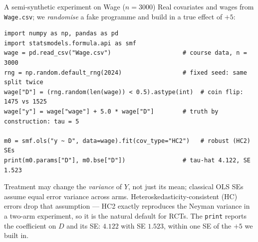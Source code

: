 \documentclass[aspectratio=169,11pt]{beamer}
\begin{document}
\begin{frame}[fragile]{A semi-synthetic experiment on Wage ($n=3000$)}
  \footnotesize
  Real covariates and wages from \texttt{Wage.csv}; we \emph{randomise} a fake programme
  and build in a true effect of $+5$:
  \begin{lstlisting}
import numpy as np, pandas as pd
import statsmodels.formula.api as smf
wage = pd.read_csv("Wage.csv")                    # course data, n = 3000
rng = np.random.default_rng(2024)                 # fixed seed: same split twice
wage["D"] = (rng.random(len(wage)) < 0.5).astype(int)  # coin flip: 1475 vs 1525
wage["y"] = wage["wage"] + 5.0 * wage["D"]        # truth by construction: tau = 5

m0 = smf.ols("y ~ D", data=wage).fit(cov_type="HC2")   # robust (HC2) SEs
print(m0.params["D"], m0.bse["D"])                # tau-hat 4.122, SE 1.523
  \end{lstlisting}
  \begin{readme}[Why \texttt{cov\_type="HC2"}]
    Treatment may change the \emph{variance} of $Y$, not just its mean; classical OLS
    SEs assume equal error variance across arms. Heteroskedasticity-consistent (HC)
    errors drop that assumption --- HC2 exactly reproduces the Neyman variance in a
    two-arm experiment, so it is the natural default for RCTs. The \texttt{print}
    reports the coefficient on $D$ and its SE: $4.122$ with SE $1.523$, within one
    SE of the $+5$ we built in.
  \end{readme}
\end{frame}
\end{document}
